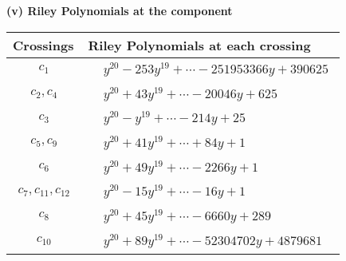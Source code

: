 \documentclass[1p]{elsarticle_modified}
\theoremstyle{definition}
\begin{document}
\newpage\renewcommand{\arraystretch}{1}
\flushleft \textbf{(v) Riley Polynomials at the component}\newline \\
\begin{tabular}{m{50pt}|m{274pt}}
Crossings & \hspace{64pt}Riley Polynomials at each crossing \\
\hline $$\begin{aligned}c_{1}\end{aligned}$$&$\begin{aligned}
&y^{20}-253 y^{19}+\cdots-251953366 y+390625
\end{aligned}$\\
\hline $$\begin{aligned}c_{2},c_{4}\end{aligned}$$&$\begin{aligned}
&y^{20}+43 y^{19}+\cdots-20046 y+625
\end{aligned}$\\
\hline $$\begin{aligned}c_{3}\end{aligned}$$&$\begin{aligned}
&y^{20}- y^{19}+\cdots-214 y+25
\end{aligned}$\\
\hline $$\begin{aligned}c_{5},c_{9}\end{aligned}$$&$\begin{aligned}
&y^{20}+41 y^{19}+\cdots+84 y+1
\end{aligned}$\\
\hline $$\begin{aligned}c_{6}\end{aligned}$$&$\begin{aligned}
&y^{20}+49 y^{19}+\cdots-2266 y+1
\end{aligned}$\\
\hline $$\begin{aligned}c_{7},c_{11},c_{12}\end{aligned}$$&$\begin{aligned}
&y^{20}-15 y^{19}+\cdots-16 y+1
\end{aligned}$\\
\hline $$\begin{aligned}c_{8}\end{aligned}$$&$\begin{aligned}
&y^{20}+45 y^{19}+\cdots-6660 y+289
\end{aligned}$\\
\hline $$\begin{aligned}c_{10}\end{aligned}$$&$\begin{aligned}
&y^{20}+89 y^{19}+\cdots-52304702 y+4879681
\end{aligned}$\\
\hline
\end{tabular}\\~\\
\end{document}
